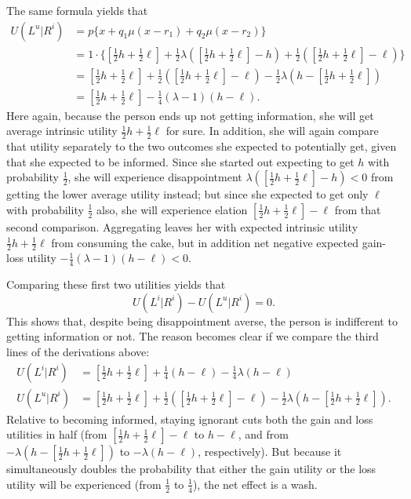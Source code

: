 \documentclass[11pt,reqno]{amsart}
\newcommand{\half}{\tfrac{1}{2}}
\newcommand{\qrtr}{\tfrac{1}{4}}
\begin{document}
The same formula yields that
\begin{align*}
  U(L^u|R^i) 
&= p\bigl\{x + q_1\mu(x - r_1) + q_2\mu(x - r_2)\bigr\}
\\
&= 1\cdot\bigl\{[\half h + \half \ell] + \half\lambda([\half h + \half \ell] -
h) + \half([\half h + \half \ell] - \ell)\bigr\}\\
&= [\half h + \half \ell] + 
   \half\left([\half h + \half \ell] - \ell\right)
   -\half\lambda\left(h - [\half h + \half \ell]\right)\\
&= [\half h + \half \ell] - \qrtr(\lambda-1)(h - \ell).
\end{align*}
Here again, because the person ends up not getting information, she will get
average intrinsic utility $\half h + \half \ell$ for sure. In addition, she
will again compare that utility separately to the two outcomes she expected to
potentially get, given that she expected to be informed. Since she started out
expecting to get $h$ with probability $\half$, she will experience
disappointment $\lambda([\half h + \half \ell] - h) < 0$ from getting the
lower average utility instead; but since she expected to get only $\ell$ with
probability $\half$ also, she will experience elation $[\half h + \half\ell] -
\ell$ from that second comparison. Aggregating leaves her with expected
intrinsic utility $\half h + \half \ell$ from consuming the cake, but in
addition net negative expected gain-loss utility $-\qrtr(\lambda - 1)(h -
\ell) < 0$. 

Comparing these first two utilities yields that
\begin{equation*}
  U(L^i|R^i) - U(L^u|R^i) = 0.
\end{equation*}
This shows that, despite being disappointment averse, the person is indifferent
to getting information or not. The reason becomes clear if we compare the
third lines of the derivations above:
\begin{align*}
  U(L^i|R^i) &= [\half h + \half \ell] + 
  \qrtr (h-\ell) - \qrtr \lambda(h-\ell)\\
  U(L^u|R^i) &= [\half h + \half \ell] + 
  \half\left([\half h + \half \ell] - \ell\right)
  -\half\lambda\left(h - [\half h + \half \ell]\right).
\end{align*}
Relative to becoming informed, staying ignorant cuts both the gain and loss
utilities in half (from $[\half h + \half \ell] - \ell$ to $h - \ell$, and
from $-\lambda(h - [\half h + \half \ell])$ to $-\lambda(h - \ell)$,
respectively). But because it simultaneously doubles the probability that
either the gain utility or the loss utility will be experienced (from $\half$
to $\qrtr$), the net effect is a wash. 
\end{document}
